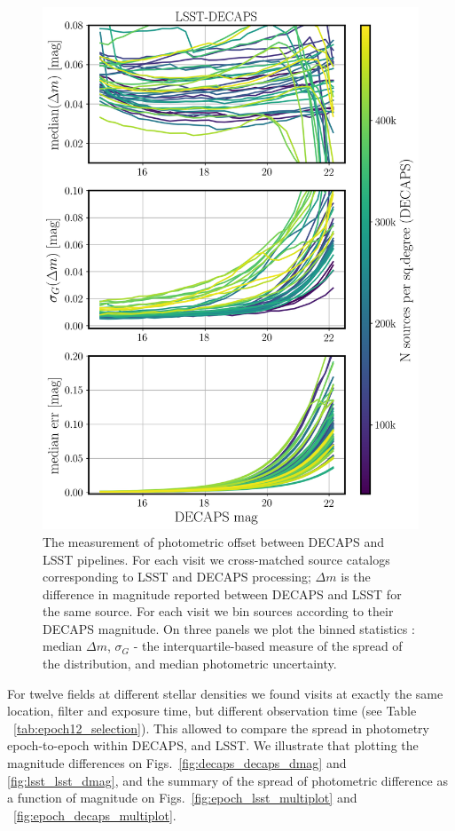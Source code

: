 \documentclass[DM,lsstdraft,toc,usenatbib]{lsstdoc}
\begin{document}
\begin{figure}
\begin{centering}
\includegraphics[width=0.7\columnwidth]{figs/decaps_lsst_rms_plot.png}
\caption{The measurement of photometric offset between DECAPS and LSST pipelines. For each visit we cross-matched source catalogs corresponding to LSST and DECAPS processing; $\Delta m$ is the difference in magnitude reported between DECAPS and LSST for the same source. For each visit we bin sources according to their DECAPS magnitude. On three panels we plot the binned statistics : median $\Delta m$,  $\sigma_{G}$ - the interquartile-based measure of the spread of the distribution, and median photometric uncertainty.}
\label{fig:lsst_decaps_dmag}
\end{centering}
\end{figure} 



For twelve  fields at different   stellar densities  we found visits at exactly the same location, filter and exposure time, but different observation time (see Table ~\ref{tab:epoch12_selection}).  This allowed to compare the spread in photometry epoch-to-epoch  within DECAPS, and LSST. We illustrate that plotting the magnitude differences on Figs.~\ref{fig:decaps_decaps_dmag} and \ref{fig:lsst_lsst_dmag}, and the summary of the spread of photometric difference as a function of magnitude on Figs.~\ref{fig:epoch_lsst_multiplot} and ~\ref{fig:epoch_decaps_multiplot}. 
\end{document}
